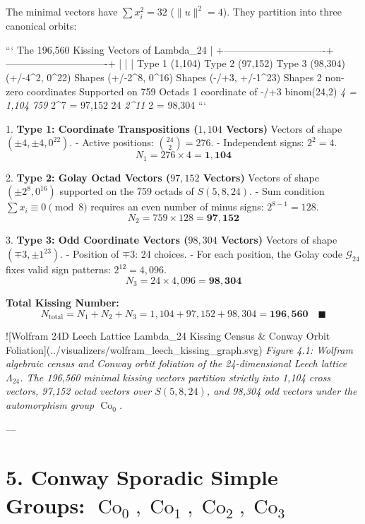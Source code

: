 \documentclass[11pt,twoside,openright]{amsbook}
\begin{document}
The minimal vectors have $\sum x_i^2 = 32$ ($\|u\|^2 = 4$). They partition into three canonical orbits:

```
                         The 196,560 Kissing Vectors of Lambda_24
                                             |
             +-------------------------------+-------------------------------+
             |                               |                               |
       Type 1 (1,104)                 Type 2 (97,152)                 Type 3 (98,304)
     (+/-4^2, 0^22) Shapes           (+/-2^8, 0^16) Shapes           (-/+3, +/-1^23) Shapes
      2 non-zero coordinates          Supported on 759 Octads          1 coordinate of -/+3
      binom(24,2) \textit{ 4 = 1,104         759 } 2^7 = 97,152               24 \textit{ 2^11 } 2 = 98,304
```

1. \textbf{Type 1: Coordinate Transpositions ($1,104$ Vectors)}
   Vectors of shape $(\pm 4, \pm 4, 0^{22})$.
   - Active positions: $\binom{24}{2} = 276$.
   - Independent signs: $2^2 = 4$.
   $$N_1 = 276 \times 4 = \mathbf{1,104}$$

2. \textbf{Type 2: Golay Octad Vectors ($97,152$ Vectors)}
   Vectors of shape $(\pm 2^8, 0^{16})$ supported on the 759 octads of $S(5, 8, 24)$.
   - Sum condition $\sum x_i \equiv 0 \pmod 8$ requires an even number of minus signs: $2^{8-1} = 128$.
   $$N_2 = 759 \times 128 = \mathbf{97,152}$$

3. \textbf{Type 3: Odd Coordinate Vectors ($98,304$ Vectors)}
   Vectors of shape $(\mp 3, \pm 1^{23})$.
   - Position of $\mp 3$: 24 choices.
   - For each position, the Golay code $\mathcal{G}_{24}$ fixes valid sign patterns: $2^{12} = 4,096$.
   $$N_3 = 24 \times 4,096 = \mathbf{98,304}$$

\textbf{Total Kissing Number:}
$$N_{\text{total}} = N_1 + N_2 + N_3 = 1,104 + 97,152 + 98,304 = \mathbf{196,560} \quad \blacksquare$$

![Wolfram 24D Leech Lattice Lambda_24 Kissing Census & Conway Orbit Foliation](../visualizers/wolfram_leech_kissing_graph.svg)
\textit{Figure 4.1: Wolfram algebraic census and Conway orbit foliation of the 24-dimensional Leech lattice $\Lambda_{24}$. The 196,560 minimal kissing vectors partition strictly into 1,104 cross vectors, 97,152 octad vectors over $S(5,8,24)$, and 98,304 odd vectors under the automorphism group $\operatorname{Co}_0$.}


---

\section{5. Conway Sporadic Simple Groups: $\operatorname{Co}_0, \operatorname{Co}_1, \operatorname{Co}_2, \operatorname{Co}_3$}
\end{document}

